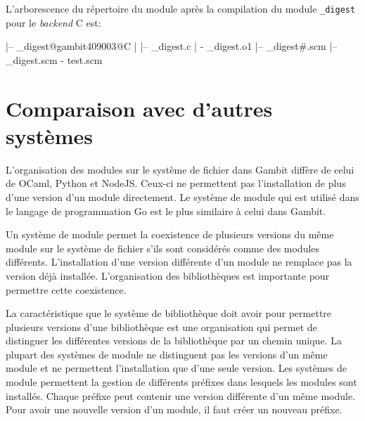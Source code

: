 \begin{center}
\end{center}

L'arborescence du répertoire du module après la compilation du module
\texttt{\_digest} pour le \textit{backend} C est:
%
\begin{center}
\begin{mplisting}{0.8}
|-- _digest@gambit409003@C
|   |-- _digest.c
|   \-- _digest.o1
|-- _digest#.scm
|-- _digest.scm
\-- test.scm
\end{mplisting}
\end{center}


\section{Comparaison avec d'autres systèmes}

L'organisation des modules sur le système de fichier dans Gambit
diffère de celui de OCaml, Python et NodeJS. Ceux-ci ne permettent pas
l'installation de plus d'une version d'un module directement. Le système
de module qui est utilisé dans le langage de programmation Go est le plus
similaire à celui dans Gambit.

Un système de module permet la coexistence de plusieurs versions du même module
sur le système de fichier s'ils sont considérés comme des modules différents.
L'installation d'une version différente d'un module ne remplace pas la version
déjà installée. L'organisation des bibliothèques est importante pour permettre
cette coexistence.

La caractéristique que le système de bibliothèque doit avoir pour permettre
plusieurs versions d'une bibliothèque est une organisation qui permet de
distinguer les différentes versions de la bibliothèque par un chemin unique.
La plupart des systèmes de module ne distinguent pas les versions d'un même
module et ne permettent l'installation que d'une seule version. Les systèmes de
module permettent la gestion de différents préfixes dans lesquels les modules sont
installés. Chaque préfixe peut contenir une version différente d'un même
module. Pour avoir une nouvelle version d'un module, il faut créer un nouveau
préfixe.



